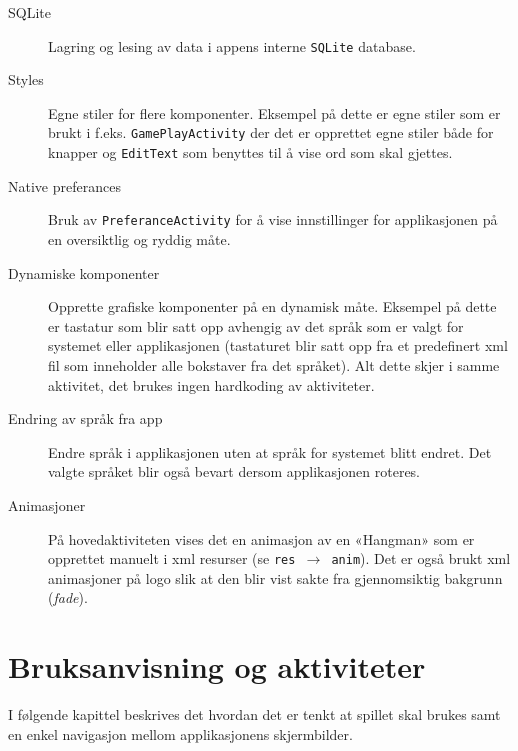 \begin{description}

\item[SQLite] Lagring og lesing av data i appens interne \texttt{SQLite} database.

\item[Styles] Egne stiler for flere komponenter. Eksempel på dette er egne stiler som er brukt i f.eks. \texttt{GamePlayActivity} der det er opprettet egne stiler både for knapper og \texttt{EditText} som benyttes til å vise ord som skal gjettes.

\item[Native preferances] Bruk av \texttt{PreferanceActivity} for å vise innstillinger for applikasjonen på en oversiktlig og ryddig måte. 

\item[Dynamiske komponenter] Opprette grafiske komponenter på en dynamisk måte. Eksempel på dette er tastatur som blir satt opp avhengig av det språk som er valgt for systemet eller applikasjonen (tastaturet blir satt opp fra et predefinert xml fil som inneholder alle bokstaver fra det språket). Alt dette skjer i samme aktivitet, det brukes ingen hardkoding av aktiviteter.

\item[Endring av språk fra app] Endre språk i applikasjonen uten at språk for systemet blitt endret. Det valgte språket blir også bevart dersom applikasjonen roteres. 

\item[Animasjoner] På hovedaktiviteten vises det en animasjon av en «Hangman» som er opprettet manuelt i xml resurser (se \texttt{res $\rightarrow$ anim}). Det er også brukt xml animasjoner på logo slik at den blir vist sakte fra gjennomsiktig bakgrunn (\textit{fade}).

\end{description}



\chapter{Bruksanvisning og aktiviteter}
I følgende kapittel beskrives det hvordan det er tenkt at spillet skal brukes samt en enkel navigasjon mellom applikasjonens skjermbilder. 

